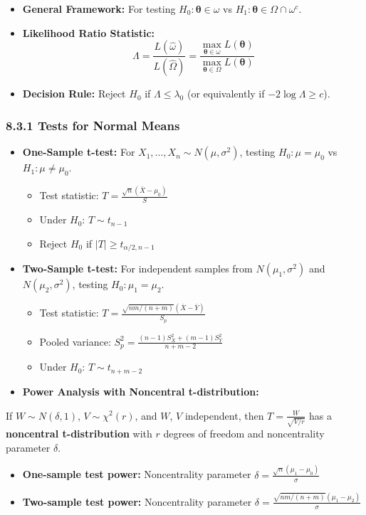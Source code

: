 \begin{itemize}
	\item \textbf{General Framework:} For testing $H_0: \boldsymbol{\theta} \in \omega$ vs $H_1: \boldsymbol{\theta} \in \Omega \cap \omega^c$.
	\item \textbf{Likelihood Ratio Statistic:}
\[
\Lambda = \frac{L(\hat{\omega})}{L(\hat{\Omega})} = \frac{\max_{\boldsymbol{\theta} \in \omega} L(\boldsymbol{\theta})}{\max_{\boldsymbol{\theta} \in \Omega} L(\boldsymbol{\theta})}
\]
	\item \textbf{Decision Rule:} Reject $H_0$ if $\Lambda \leq \lambda_0$ (or equivalently if $-2\log\Lambda \geq c$).
\end{itemize}

\subsubsection{8.3.1 Tests for Normal Means}

\begin{itemize}
	\item \textbf{One-Sample t-test:} For $X_1, \ldots, X_n \sim N(\mu, \sigma^2)$, testing $H_0: \mu = \mu_0$ vs $H_1: \mu \neq \mu_0$.
	\begin{itemize}
		\item Test statistic: $T = \frac{\sqrt{n}(\bar{X} - \mu_0)}{S}$
		\item Under $H_0$: $T \sim t_{n-1}$
		\item Reject $H_0$ if $|T| \geq t_{\alpha/2, n-1}$
	\end{itemize}
	\item \textbf{Two-Sample t-test:} For independent samples from $N(\mu_1, \sigma^2)$ and $N(\mu_2, \sigma^2)$, testing $H_0: \mu_1 = \mu_2$.
	\begin{itemize}
		\item Test statistic: $T = \frac{\sqrt{nm/(n+m)}(\bar{X} - \bar{Y})}{S_p}$
		\item Pooled variance: $S_p^2 = \frac{(n-1)S_X^2 + (m-1)S_Y^2}{n+m-2}$
		\item Under $H_0$: $T \sim t_{n+m-2}$
	\end{itemize}
	\item \textbf{Power Analysis with Noncentral t-distribution:}
\end{itemize}

\begin{definition}
If $W \sim N(\delta, 1)$, $V \sim \chi^2(r)$, and $W$, $V$ independent, then $T = \frac{W}{\sqrt{V/r}}$ has a \textbf{noncentral t-distribution} with $r$ degrees of freedom and noncentrality parameter $\delta$.
\end{definition}
\begin{itemize}
	\item \textbf{One-sample test power:} Noncentrality parameter $\delta = \frac{\sqrt{n}(\mu_1 - \mu_0)}{\sigma}$
	\item \textbf{Two-sample test power:} Noncentrality parameter $\delta = \frac{\sqrt{nm/(n+m)}(\mu_1 - \mu_2)}{\sigma}$
\end{itemize}

